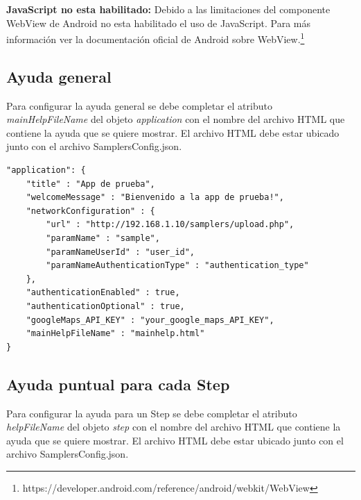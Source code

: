 \textbf{JavaScript no esta habilitado:} Debido a las limitaciones del componente WebView de Android no esta habilitado el uso de JavaScript. Para más información ver la documentación oficial de Android sobre WebView.\footnote{https://developer.android.com/reference/android/webkit/WebView}

\subsection{Ayuda general}
Para configurar la ayuda general se debe completar el atributo \textit{mainHelpFileName} del objeto \textit{application} con el nombre del archivo HTML que contiene la ayuda que se quiere mostrar. El archivo HTML debe estar ubicado junto con el archivo SamplersConfig.json.

\clearpage

\begin{lstlisting}[language=XML, frame=tlbr, caption=Ejemplo de configuración de ayuda general (línea 13).]
"application": {
	"title" : "App de prueba",
	"welcomeMessage" : "Bienvenido a la app de prueba!",
	"networkConfiguration" : {
		"url" : "http://192.168.1.10/samplers/upload.php",
		"paramName" : "sample",
		"paramNameUserId" : "user_id",
		"paramNameAuthenticationType" : "authentication_type"
	},
	"authenticationEnabled" : true,
	"authenticationOptional" : true,
	"googleMaps_API_KEY" : "your_google_maps_API_KEY",
	"mainHelpFileName" : "mainhelp.html"
}
\end{lstlisting}

\subsection{Ayuda puntual para cada Step}
Para configurar la ayuda para un Step se debe completar el atributo \textit{helpFileName} del objeto \textit{step} con el nombre del archivo HTML que contiene la ayuda que se quiere mostrar. El archivo HTML debe estar ubicado junto con el archivo SamplersConfig.json.

